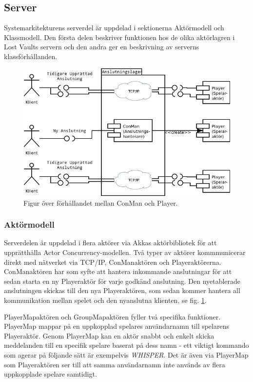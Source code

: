 \documentclass[a4paper]{article}
\begin{document}
\subsection{Server}
Systemarkitekturens serverdel är uppdelad i sektionerna Aktörmodell och Klassmodell. Den första delen beskriver funktionen hos de olika aktörlagren i Lost Vaults servern och den andra ger en  beskrivning av serverns klassförhållanden.

\begin{figure}[hbt]
\centering
\includegraphics[width=1.0\textwidth]{serverActorModel2-1}
\caption{\label{fig:ConManPlayer}Figur över förhållandet mellan ConMan och Player.}
\end{figure}

\subsubsection{Aktörmodell}
Serverdelen är uppdelad i flera aktörer via Akkas aktörbibliotek för att upprätthålla Actor Concurrency-modellen. 
Två typer av aktörer kommmunicerar direkt med nätverket via TCP/IP, ConManaktören och Playeraktörerna. ConManaktören har som syfte att hantera inkommande anslutningar för att sedan starta en ny Playeraktör för varje godkänd anslutning. Den nyetablerade anslutningen skickas till den nya Playeraktören, som sedan kommer hantera all kommunikation mellan spelet och den nyanslutna klienten, se fig. \ref{fig:ConManPlayer}.

PlayerMapaktören och GroupMapaktören fyller två specifika funktioner. PlayerMap mappar på en uppkopplad spelares användarnamn till spelarens Playeraktör. Genom PlayerMap kan en aktör snabbt och enkelt skicka meddelanden till en specifik spelare baserat på dess namn - ett viktigt kommando som agerar på följande sätt är exempelvis \textit{WHISPER}. Det är även via PlayerMap som Playeraktören ser till att samma användarnamn inte används av flera uppkopplade spelare samtidigt.
\end{document}
